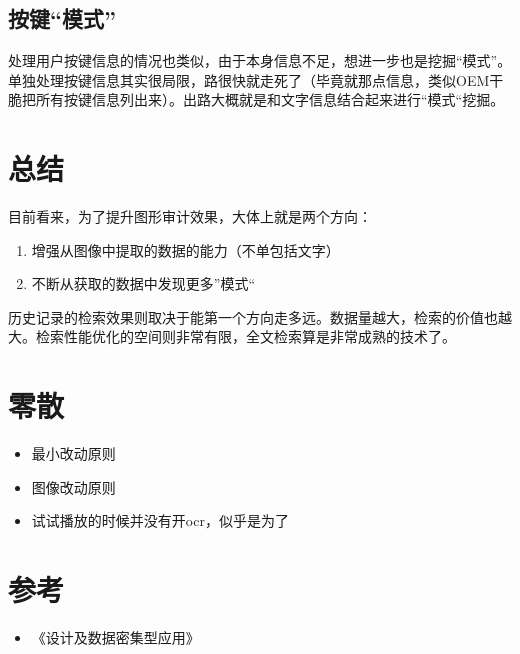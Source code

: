 \documentclass[fontset=windows,11pt]{ctexart}
\begin{document}
\subsection{按键“模式”}
\label{sec-4-3}
处理用户按键信息的情况也类似，由于本身信息不足，想进一步也是挖掘“模式”。单独处理按键信息其实很局限，路很快就走死了（毕竟就那点信息，类似OEM干脆把所有按键信息列出来）。出路大概就是和文字信息结合起来进行“模式“挖掘。
\section{总结}
\label{sec-5}
目前看来，为了提升图形审计效果，大体上就是两个方向：
\begin{enumerate}
\item 增强从图像中提取的数据的能力（不单包括文字）
\item 不断从获取的数据中发现更多”模式“
\end{enumerate}

历史记录的检索效果则取决于能第一个方向走多远。数据量越大，检索的价值也越大。检索性能优化的空间则非常有限，全文检索算是非常成熟的技术了。
\section{零散}
\label{sec-6}
\begin{itemize}
\item 最小改动原则
\item 图像改动原则
\item 试试播放的时候并没有开ocr，似乎是为了
\end{itemize}
\section{参考}
\label{sec-7}
\begin{itemize}
\item 《设计及数据密集型应用》
\end{itemize}
\end{document}
